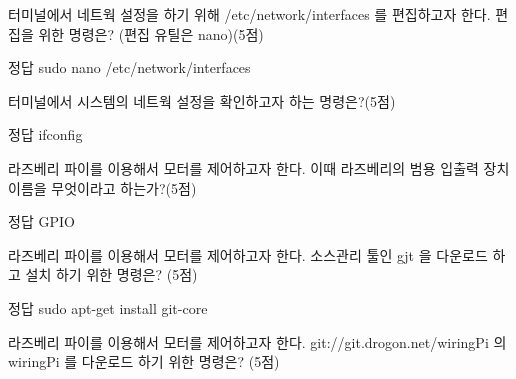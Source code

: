 \documentclass[A4paper,chapter,footnote,5pt]{oblivoir}
\begin{document}
\begin{Exlist}
\item 터미널에서 네트웍 설정을 하기 위해 /etc/network/interfaces 를 편집하고자 한다. 편집을 위한 명령은? (편집 유틸은 nano)(5점)

\begin{solution}\begin{explain}
\item[정답] sudo nano /etc/network/interfaces
\end{explain}\end{solution}

\item 터미널에서 시스템의 네트웍 설정을 확인하고자 하는 명령은?(5점)

\begin{solution}\begin{explain}
\item[정답] ifconfig
\end{explain}\end{solution}



\item 라즈베리 파이를 이용해서 모터를 제어하고자 한다. 이때 라즈베리의 범용 입출력 장치 이름을 무엇이라고 하는가?(5점)

\begin{solution}\begin{explain}
\item[정답] GPIO
\end{explain}\end{solution}


\item 라즈베리 파이를 이용해서 모터를 제어하고자 한다. 소스관리 툴인 gjt 을 다운로드 하고 설치 하기 위한 명령은? (5점)

\begin{solution}\begin{explain}
\item[정답] sudo apt-get install git-core
\end{explain}\end{solution}


\item 라즈베리 파이를 이용해서 모터를 제어하고자 한다. git://git.drogon.net/wiringPi 의 wiringPi 를 다운로드 하기 위한 명령은? (5점)


\end{Exlist}
\end{document}

